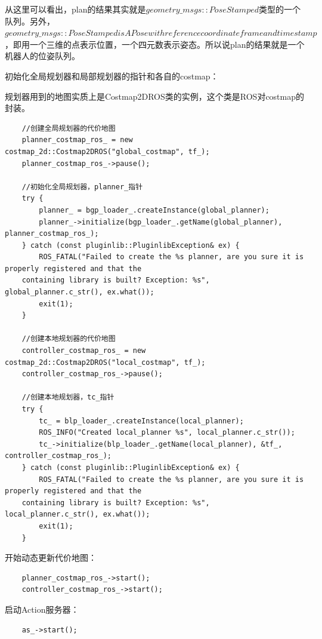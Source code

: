 \documentclass[9pt, oneside]{book}
\begin{document}
从这里可以看出，plan的结果其实就是$geometry\_msgs::PoseStamped$类型的一个队列。另外，$geometry\_msgs::PoseStamped is A Pose with reference coordinate frame and timestamp$
，即用一个三维的点表示位置，一个四元数表示姿态。所以说plan的结果就是一个机器人的位姿队列。

初始化全局规划器和局部规划器的指针和各自的costmap：

规划器用到的地图实质上是Costmap2DROS类的实例，这个类是ROS对costmap的封装。

\footnotesize
\begin{verbatim}
    //创建全局规划器的代价地图
    planner_costmap_ros_ = new costmap_2d::Costmap2DROS("global_costmap", tf_);
    planner_costmap_ros_->pause();

    //初始化全局规划器，planner_指针
    try {
        planner_ = bgp_loader_.createInstance(global_planner);
        planner_->initialize(bgp_loader_.getName(global_planner), planner_costmap_ros_);
    } catch (const pluginlib::PluginlibException& ex) {
        ROS_FATAL("Failed to create the %s planner, are you sure it is properly registered and that the 
    containing library is built? Exception: %s", global_planner.c_str(), ex.what());
        exit(1);
    }

    //创建本地规划器的代价地图
    controller_costmap_ros_ = new costmap_2d::Costmap2DROS("local_costmap", tf_);
    controller_costmap_ros_->pause();

    //创建本地规划器，tc_指针
    try {
        tc_ = blp_loader_.createInstance(local_planner);
        ROS_INFO("Created local_planner %s", local_planner.c_str());
        tc_->initialize(blp_loader_.getName(local_planner), &tf_, controller_costmap_ros_);
    } catch (const pluginlib::PluginlibException& ex) {
        ROS_FATAL("Failed to create the %s planner, are you sure it is properly registered and that the 
    containing library is built? Exception: %s", local_planner.c_str(), ex.what());
        exit(1);
    }
\end{verbatim}
\normalsize

开始动态更新代价地图：

\begin{verbatim}
    planner_costmap_ros_->start();
    controller_costmap_ros_->start();
\end{verbatim}

启动Action服务器：

\begin{verbatim}
    as_->start();
\end{verbatim}
\end{document}
